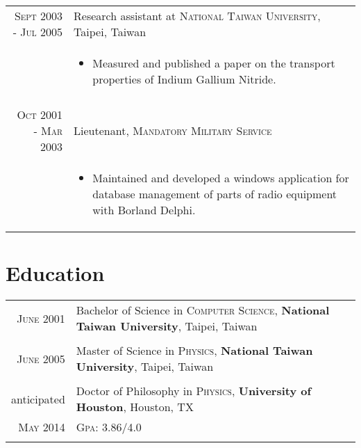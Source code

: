 \documentclass[11pt]{article} %
\begin{document}
\begin{tabular}{r|p{12cm}}
\textsc{Sept 2003 - Jul 2005} & Research assistant at \textsc{National Taiwan University}, Taipei, Taiwan \\
& \small
\begin{itemize}
  \item Measured and published a paper on the transport properties of Indium Gallium Nitride.
\end{itemize}
\\
\multicolumn{2}{c}{} \\


\textsc{Oct 2001 - Mar 2003} & Lieutenant, \textsc{Mandatory Military Service} \\
& \small
\begin{itemize}
  \item Maintained and developed a windows application for database management of parts of radio equipment with Borland Delphi.
\end{itemize}

\end{tabular}


\section{Education}

\begin{tabular}{rl}
\textsc{June} 2001 & Bachelor of Science in \textsc{Computer Science}, \textbf{National Taiwan University}, Taipei, Taiwan\\
&\\


\textsc{June} 2005 & Master of Science in \textsc{Physics}, \textbf{National Taiwan University}, Taipei, Taiwan \\
&\\

	
anticipated & Doctor of Philosophy in \textsc{Physics}, \textbf{University of Houston}, Houston, TX\\
\textsc{May} 2014 &\normalsize \textsc{Gpa}: 3.86/4.0 \\%
&\\


\end{tabular}
\end{document}
